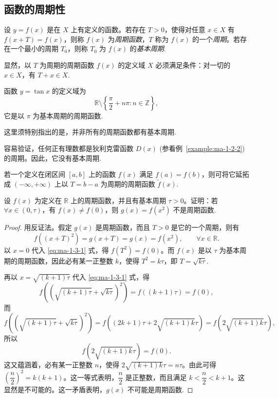 \subsection{函数的周期性}
\label{subsec:ma-1-3-3}

设 $y=f(x)$ 是在 $X$ 上有定义的函数。若存在 $T>0$，使得对任意 $x\in X$ 有 $f(x+T)=f(x)$，则称 $f(x)$ 为\emph{周期函数}，$T$ 称为 $f(x)$ 的一个\emph{周期}。若存在一个最小的周期 $T_0$，则称 $T_0$ 为 $f(x)$ 的\emph{基本周期}.

显然，以 $T$ 为周期的周期函数 $f(x)$ 的定义域 $X$ 必须满足条件：对一切的 $x\in X$，有 $T+x\in X$.

\begin{example}\label{example:ma-1-3-5}
函数 $y=\tan x$ 的定义域为
\[
  \mathbb{R}\setminus\left\{\frac\pi2+n\pi:n\in\mathbb{Z}\right\},
\]
它是以 $\pi$ 为基本周期的周期函数.

这里须特别指出的是，并非所有的周期函数都有基本周期.
\end{example}


\begin{example}\label{example:ma-1-3-6}
容易验证，任何正有理数都是狄利克雷函数 $D(x)$ (参看例~\ref{example:ma-1-2-2}) 的周期。因此，它没有基本周期.
\end{example}

若一个定义在闭区间 $[a,b]$ 上的函数 $f(x)$ 满足 $f(a)=f(b)$，则可将它延拓成 $(-\infty,+\infty)$ 上以 $T=b-a$ 为周期的周期函数 $\tilde f(x)$.

\begin{example}\label{example:ma-1-3-7}
设 $f(x)$ 为定义在 $\mathbb{R}$ 上的周期函数，并且有基本周期 $\tau>0$。证明：若 $\forall x\in(0,\tau)$，有 $f(x)\ne f(0)$，则 $g(x)=f(x^2)$ 不是周期函数.
\end{example}


\begin{proof}
用反证法。假定 $g(x)$ 是周期函数，而且 $T>0$ 是它的一个周期，则有
\begin{equation}
  f((x+T)^2)=g(x+T)=g(x)=f(x^2),\qquad \forall x\in\mathbb{R}.
  \label{eq:ma-1-3-1}
\end{equation}
以 $x=0$ 代入 \eqref{eq:ma-1-3-1} 式，得 $f(T^2)=f(0)$。而 $f(x)$ 是以 $\tau$ 为基本周期的周期函数，因此必有某一正整数 $k$，使得 $T^2=k\tau$，即 $T=\sqrt{k\tau}$.

再以 $x=\sqrt{(k+1)\tau}$ 代入 \eqref{eq:ma-1-3-1} 式，得
\[
  f\left(\left(\sqrt{(k+1)\tau}+\sqrt{k\tau}\right)^2\right)=f((k+1)\tau)=f(0),
\]
而
\[
  f\left(\left(\sqrt{(k+1)\tau}+\sqrt{k\tau}\right)^2\right)
  =f\left((2k+1)\tau+2\sqrt{(k+1)k}\tau\right)
  =f(2\sqrt{(k+1)k}\tau),
\]
所以
\[
  f(2\sqrt{(k+1)k}\tau)=f(0).
\]
这又蕴涵着，必有某一正整数 $n$，使得 $2\sqrt{(k+1)k}\tau=n\tau$。由此可得 $\left(\dfrac n2\right)^2=k(k+1)$。这一等式表明，$\dfrac n2$ 是正整数，而且满足 $k<\dfrac n2<k+1$。这显然是不可能的。这一矛盾表明，$g(x)$ 不可能是周期函数.
\end{proof}


